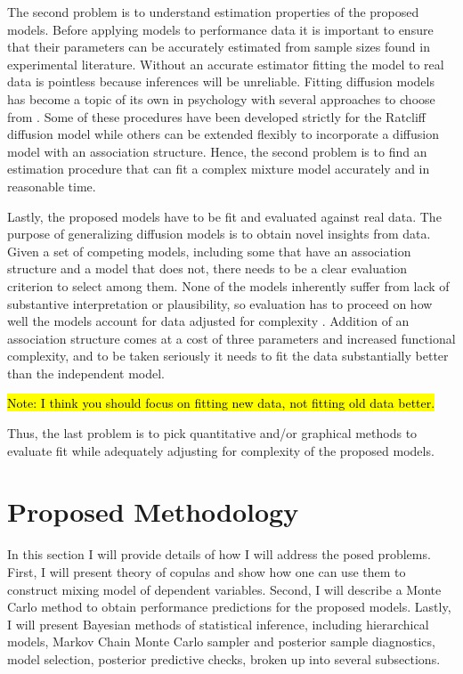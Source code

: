 \documentclass[12pt]{article}
\newcommand{\trish}[1]{\textrm{\hl{#1}}}
\begin{document}
The second problem is to understand estimation
properties of the proposed models. Before applying models to performance
data it is important to ensure that their parameters can be accurately
estimated from sample sizes found in experimental literature. Without an
accurate estimator fitting the model to real data is pointless because
inferences will be unreliable. Fitting diffusion models has become a topic
of its own in psychology with several approaches to choose from
\citep{VosVos2007,RatTue2002,VanTue2007,VanTue2011}. Some of these
procedures have been developed strictly for the Ratcliff diffusion model
while others can be extended flexibly to incorporate a diffusion model with
an association structure. Hence, the second problem is to find an
estimation procedure that can fit a complex mixture model accurately and in
reasonable time.
    
Lastly, the proposed models have to be fit and evaluated against real
data. The purpose of generalizing diffusion models is to
obtain novel insights from data. Given a set of competing models,
including some that have an association structure and a model
that does not, there needs to be a clear evaluation criterion
to select among them. None of the models inherently suffer from lack
of substantive interpretation or plausibility, so evaluation has to
proceed on how well the models account for data adjusted for
complexity \citep{CavMyu2013}. Addition of an association structure
comes at a cost of three parameters and increased functional
complexity, and to be taken seriously it needs to fit the data
substantially better than the independent model. 

\trish{Note: I think
you should focus on fitting new data, not fitting old data better.}


Thus, the last problem is to pick quantitative and/or graphical methods to evaluate fit while adequately adjusting for
complexity of the proposed models.


\section{Proposed Methodology}

In this section I will provide details of how I will address the posed problems. First, I will present theory of copulas and show how one can use them to construct mixing model of dependent variables. Second, I will describe a Monte Carlo method to obtain performance predictions for the proposed models. Lastly, I will present Bayesian methods of statistical inference, including hierarchical models, Markov Chain Monte Carlo sampler and posterior sample diagnostics, model selection, posterior predictive checks, broken up into several subsections.
\end{document}
